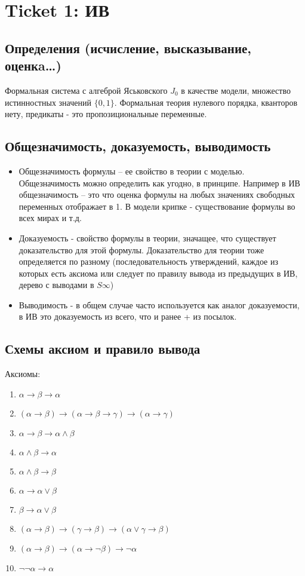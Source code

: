 \section{Ticket 1: ИВ}
\label{sec-3}
\subsection{Определения (исчисление, высказывание, оценкa\ldots{})}
\label{sec-3-1}
Формальная система с алгеброй Яськовского $J_{0}$ в качестве модели, множество
истинностных значений $\lbrace 0, 1 \rbrace$. Формальная теория нулевого порядка, кванторов
нету, предикаты - это пропозициональные переменные.
\subsection{Общезначимость, доказуемость, выводимость}
\label{sec-3-2}
\begin{itemize}
\item Общезначимость формулы -- ее свойство в теории с моделью. Общезначимость
можно определить как угодно, в принципе. Например в ИВ общезначимость --
это что оценка формулы на любых значениях свободных переменных отображает
в 1. В модели крипке - существование формулы во всех мирах и т.д.
\item Доказуемость - свойство формулы в теории, значащее, что существует
доказательство для этой формулы. Доказательство для теории тоже определяется
по разному (последовательность утверждений, каждое из которых есть аксиома
или следует по правилу вывода из предыдущих в ИВ, дерево с выводами в $S\infty$)
\item Выводимость - в общем случае часто используется как аналог доказуемости,
в ИВ это доказуемость из всего, что и ранее + из посылок.
\end{itemize}
\subsection{Схемы аксиом и правило вывода}
\label{sec-3-3}
Аксиомы:
\begin{enumerate}
\item $\alpha \to \beta \to \alpha$
\item $(\alpha \to \beta) \to (\alpha \to \beta \to \gamma) \to (\alpha \to \gamma)$
\item $\alpha \to \beta \to \alpha \land \beta$
\item $\alpha \land \beta \to \alpha$
\item $\alpha \land \beta \to \beta$
\item $\alpha \to \alpha \lor \beta$
\item $\beta \to \alpha \lor \beta$
\item $(\alpha \to \beta) \to (\gamma \to \beta) \to (\alpha \lor \gamma \to \beta)$
\item $(\alpha \to \beta) \to (\alpha \to \lnot \beta) \to \lnot \alpha$
\item $\lnot \lnot \alpha \to \alpha$
\end{enumerate}

